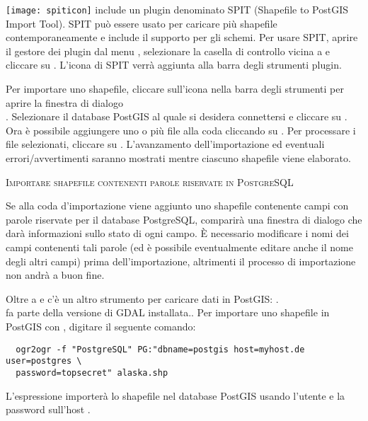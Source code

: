 \texttt{[image: spiticon]} \qg include un plugin denominato SPIT 
(Shapefile to PostGIS Import Tool).
SPIT può essere usato per caricare più shapefile contemporaneamente e
include il supporto per gli schemi. Per usare SPIT, aprire il gestore dei plugin
dal menu , selezionare la casella di controllo vicina a
 e cliccare su . L'icona di SPIT verrà aggiunta alla
barra degli strumenti plugin. 

Per importare uno shapefile, cliccare sull'icona  
nella barra degli strumenti per aprire la finestra di dialogo \\
. Selezionare il database 
PostGIS al quale si desidera connettersi e cliccare su .
Ora è possibile aggiungere uno o più file alla coda cliccando su . 
Per processare i file selezionati, cliccare su . L'avanzamento 
dell'importazione ed eventuali errori/avvertimenti saranno mostrati mentre 
ciascuno shapefile viene elaborato.

\begin{Tip}\caption{\textsc{Importare shapefile contenenti parole riservate 
in PostgreSQL}}
Se alla coda d'importazione viene aggiunto uno shapefile contenente campi 
con parole riservate per il database PostgreSQL, comparirà una finestra di dialogo
che darà informazioni sullo stato di ogni campo. È necessario modificare i nomi
dei campi contenenti tali parole (ed è possibile eventualmente editare anche
il nome degli altri campi) 
prima dell'importazione, altrimenti il processo di importazione non
andrà a buon fine.
\end{Tip} 

Oltre a  e  c'è un altro strumento per
caricare dati in PostGIS: . \\
 fa parte della versione di GDAL installata..
Per importare uno shapefile in PostGIS con , digitare il 
seguente comando:
\begin{verbatim}
  ogr2ogr -f "PostgreSQL" PG:"dbname=postgis host=myhost.de user=postgres \
  password=topsecret" alaska.shp
\end{verbatim}

L'espressione importerà lo shapefile  nel database PostGIS
\usertext{postgis}
usando l'utente  e la password  sull'host
\server{myhost.it}.

